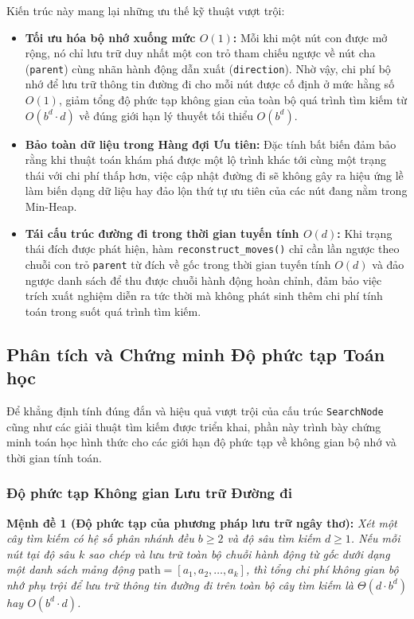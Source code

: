 Kiến trúc này mang lại những ưu thế kỹ thuật vượt trội:
\begin{itemize}[--]
    \item \textbf{Tối ưu hóa bộ nhớ xuống mức $O(1)$:}
    Mỗi khi một nút con được mở rộng, nó chỉ lưu trữ duy nhất một con trỏ tham chiếu ngược về nút cha
    (\texttt{parent}) cùng nhãn hành động dẫn xuất (\texttt{direction}). Nhờ vậy, chi phí bộ nhớ
    để lưu trữ thông tin đường đi cho mỗi nút được cố định ở mức hằng số $O(1)$, giảm tổng độ phức tạp
    không gian của toàn bộ quá trình tìm kiếm từ $O(b^d \cdot d)$ về đúng giới hạn lý thuyết tối thiểu $O(b^d)$.
    
    \item \textbf{Bảo toàn dữ liệu trong Hàng đợi Ưu tiên:}
    Đặc tính bất biến đảm bảo rằng khi thuật toán khám phá được một lộ trình
    khác tới cùng một trạng thái với chi phí thấp hơn, việc cập nhật đường đi sẽ không gây ra hiệu ứng lề
    làm biến dạng dữ liệu hay đảo lộn thứ tự ưu tiên của các nút đang nằm trong Min-Heap.

    \item \textbf{Tái cấu trúc đường đi trong thời gian tuyến tính $O(d)$:}
    Khi trạng thái đích được phát hiện, hàm \texttt{reconstruct\_moves()} chỉ cần lần ngược theo chuỗi con trỏ
    \texttt{parent} từ đích về gốc trong thời gian tuyến tính $O(d)$ và đảo ngược danh sách để thu được chuỗi hành
    động hoàn chỉnh, đảm bảo việc trích xuất nghiệm diễn ra tức thời mà không phát sinh thêm chi phí tính toán
    trong suốt quá trình tìm kiếm.
\end{itemize}

\subsection{Phân tích và Chứng minh Độ phức tạp Toán học}
\label{subsec:complexity_analysis}
Để khẳng định tính đúng đắn và hiệu quả vượt trội của cấu trúc \texttt{SearchNode}
cũng như các giải thuật tìm kiếm được triển khai, phần này trình bày chứng minh
toán học hình thức cho các giới hạn độ phức tạp về không gian bộ nhớ và thời gian tính toán.

\subsubsection{Độ phức tạp Không gian Lưu trữ Đường đi}

\noindent
\textbf{Mệnh đề 1 (Độ phức tạp của phương pháp lưu trữ ngây thơ):}
\textit{Xét một cây tìm kiếm có hệ số phân nhánh đều $b \ge 2$ và độ sâu tìm kiếm $d \ge 1$.
Nếu mỗi nút tại độ sâu $k$ sao chép và lưu trữ toàn bộ chuỗi hành động từ gốc dưới dạng một
danh sách mảng động $\text{path} = [a_1, a_2, \dots, a_k]$, thì tổng chi phí không gian bộ nhớ
phụ trội để lưu trữ thông tin đường đi trên toàn bộ cây tìm kiếm là $\Theta(d \cdot b^d)$
hay $O(b^d \cdot d)$.}

